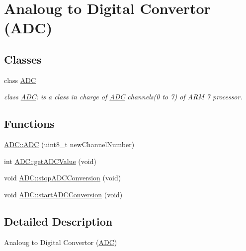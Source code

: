 \hypertarget{group__group5}{
\section{Analoug to Digital Convertor (ADC)}
\label{group__group5}
}
\subsection*{Classes}
\begin{DoxyCompactItemize}
\item 
class \hyperlink{class_a_d_c}{ADC}
\begin{DoxyCompactList}\small\item\em class \hyperlink{class_a_d_c}{ADC}: is a class in charge of \hyperlink{class_a_d_c}{ADC} channels(0 to 7) of ARM 7 processor. \end{DoxyCompactList}\end{DoxyCompactItemize}
\subsection*{Functions}
\begin{DoxyCompactItemize}
\item 
\hyperlink{group__group5_ga39aa0008a42a3d884f95497fa76cdb87}{ADC::ADC} (uint8\_\-t newChannelNumber)
\item 
int \hyperlink{group__group5_gad8b2af8332757e9ac4e54b8aed5c874f}{ADC::getADCValue} (void)
\item 
void \hyperlink{group__group5_ga863274d7f0e3450c4ae52eadc397bea5}{ADC::stopADCConversion} (void)
\item 
void \hyperlink{group__group5_gae5f6a9de2dcd638d16f5054a8e0eb29f}{ADC::startADCConversion} (void)
\end{DoxyCompactItemize}


\subsection{Detailed Description}
Analoug to Digital Convertor (\hyperlink{class_a_d_c}{ADC}) 

